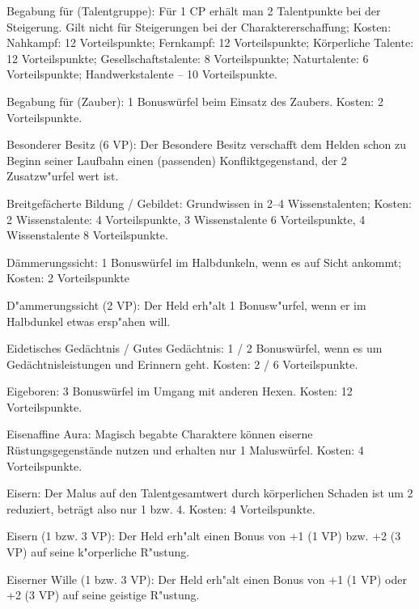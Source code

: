 \begin{description}
\item{Begabung für (Talentgruppe):} Für 1 CP erhält man 2 Talentpunkte bei der Steigerung. Gilt nicht für Steigerungen bei der Charaktererschaffung; Kosten: Nahkampf: 12 Vorteilspunkte; Fernkampf: 12 Vorteilspunkte; Körperliche Talente: 12 Vorteilspunkte; Gesellschaftstalente: 8 Vorteilspunkte; Naturtalente: 6 Vorteilspunkte; Handwerkstalente – 10 Vorteilspunkte.

\item{Begabung für (Zauber):} 1 Bonuswürfel beim Einsatz des Zaubers. Kosten: 2 Vorteilspunkte.

\item{Besonderer Besitz (6 VP):}
Der Besondere Besitz verschafft dem Helden schon zu Beginn seiner Laufbahn einen (passenden) Konfliktgegenstand, der 2 Zusatzw"urfel wert ist.

\item{Breitgefächerte Bildung / Gebildet:} Grundwissen in 2–4 Wissenstalenten; Kosten: 2 Wissenstalente: 4 Vorteilspunkte, 3 Wissenstalente 6 Vorteilspunkte, 4 Wissenstalente 8 Vorteilspunkte.

\item{Dämmerungssicht:} 1 Bonuswürfel im Halbdunkeln, wenn es auf Sicht ankommt; Kosten: 2 Vorteilspunkte

\item{D"ammerungssicht (2 VP):} Der Held erh"alt 1 Bonusw"urfel, wenn er im Halbdunkel etwas ersp"ahen will.

\item{Eidetisches Gedächtnis / Gutes Gedächtnis:} 1 / 2 Bonuswürfel, wenn es um Gedächtnisleistungen und Erinnern geht. Kosten: 2 / 6 Vorteilspunkte.

\item{Eigeboren:} 3 Bonuswürfel im Umgang mit anderen Hexen. Kosten: 12 Vorteilspunkte.

\item{Eisenaffine Aura:} Magisch begabte Charaktere können eiserne Rüstungsgegenstände nutzen und erhalten nur 1 Maluswürfel. Kosten: 4 Vorteilspunkte.

\item{Eisern:} Der Malus auf den Talentgesamtwert durch körperlichen Schaden ist um 2 reduziert, beträgt also nur 1 bzw. 4. Kosten: 4 Vorteilspunkte.

\item{Eisern (1 bzw. 3 VP):}
Der Held erh"alt einen Bonus von +1 (1 VP) bzw. +2 (3 VP) auf seine k"orperliche R"ustung.

\item{Eiserner Wille (1 bzw. 3 VP):} Der Held erh"alt einen Bonus von +1 (1 VP) oder +2 (3 VP) auf seine geistige R"ustung.


\end{description}
